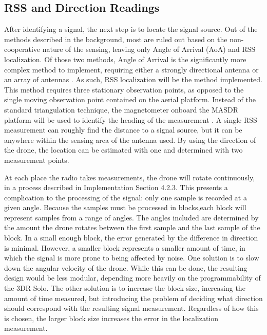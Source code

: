 \subsection{RSS and Direction Readings}
After identifying a signal, the next step is to locate the signal source. Out of the methods described in the background, most are ruled out based on the non-cooperative nature of the sensing, leaving only Angle of Arrival (AoA) and RSS localization. Of those two methods, Angle of Arrival is the significantly more complex method to implement, requiring either a strongly directional antenna or an array of antennas \cite{local_aoa}. As such, RSS localization will be the method implemented. This method requires three stationary observation points, as opposed to the single moving observation point contained on the aerial platform. Instead of the standard triangulation technique, the magnetometer onboard the MASDR platform will be used to identify the heading of the measurement \cite{rss_calc}. A single RSS measurement can roughly find the distance to a signal source, but it can be anywhere within the sensing area of the antenna used. By using the direction of the drone, the location can be estimated with one and determined with two measurement points.\par 
At each place the radio takes measurements, the drone will rotate continuously, in a process described in Implementation Section 4.2.3. This presents a complication to the processing of the signal: only one sample is recorded at a given angle. Because the samples must be processed in blocks,each block will represent samples from a range of angles. The angles included are determined by the amount the drone rotates between the first sample and the last sample of the block. In a small enough block, the error generated by the difference in direction is minimal. However, a smaller block represents a smaller amount of time, in which the signal is more prone to being affected by noise. One solution is to slow down the angular velocity of the drone. While this can be done, the resulting design would be less modular, depending more heavily on the programmability of the 3DR Solo. The other solution is to increase the block size, increasing the amount of time measured, but introducing the problem of deciding what direction should correspond with the resulting signal measurement. Regardless of how this is chosen, the larger block size increases the error in the localization measurement.\par 
